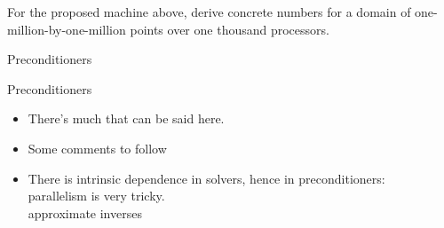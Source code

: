 \begin{longstory}
\begin{exerciseframe}
  For the proposed machine above, derive concrete numbers
  for a domain of one-million-by-one-million points over one thousand processors.
\end{exerciseframe}

 {Preconditioners}

\begin{frame}{Preconditioners}
  \begin{itemize}
  \item There's much that can be said here.
  \item Some comments to follow
  \item There is intrinsic dependence in solvers, hence in preconditioners:\\
    parallelism is very tricky.\\
    approximate inverses
  \end{itemize}
\end{frame}

\end{longstory}
